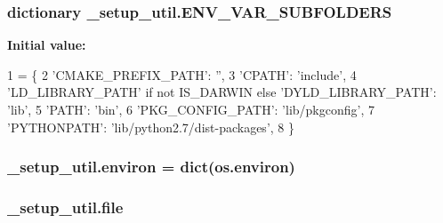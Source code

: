 \subsubsection[{\texorpdfstring{E\+N\+V\+\_\+\+V\+A\+R\+\_\+\+S\+U\+B\+F\+O\+L\+D\+E\+RS}{ENV_VAR_SUBFOLDERS}}]{\setlength{\rightskip}{0pt plus 5cm}dictionary \+\_\+setup\+\_\+util.\+E\+N\+V\+\_\+\+V\+A\+R\+\_\+\+S\+U\+B\+F\+O\+L\+D\+E\+RS}\hypertarget{namespace__setup__util_aa31804f1be8660156ce9394b33c68dc4}{}\label{namespace__setup__util_aa31804f1be8660156ce9394b33c68dc4}
{\bfseries Initial value\+:}
\begin{DoxyCode}
1 = \{
2     \textcolor{stringliteral}{'CMAKE\_PREFIX\_PATH'}: \textcolor{stringliteral}{''},
3     \textcolor{stringliteral}{'CPATH'}: \textcolor{stringliteral}{'include'},
4     \textcolor{stringliteral}{'LD\_LIBRARY\_PATH'} \textcolor{keywordflow}{if} \textcolor{keywordflow}{not} IS\_DARWIN \textcolor{keywordflow}{else} \textcolor{stringliteral}{'DYLD\_LIBRARY\_PATH'}: \textcolor{stringliteral}{'lib'},
5     \textcolor{stringliteral}{'PATH'}: \textcolor{stringliteral}{'bin'},
6     \textcolor{stringliteral}{'PKG\_CONFIG\_PATH'}: \textcolor{stringliteral}{'lib/pkgconfig'},
7     \textcolor{stringliteral}{'PYTHONPATH'}: \textcolor{stringliteral}{'lib/python2.7/dist-packages'},
8 \}
\end{DoxyCode}
\subsubsection[{\texorpdfstring{environ}{environ}}]{\setlength{\rightskip}{0pt plus 5cm}\+\_\+setup\+\_\+util.\+environ = dict(os.\+environ)}\hypertarget{namespace__setup__util_a9a935bdd9ee1aa0327161025bb18c136}{}\label{namespace__setup__util_a9a935bdd9ee1aa0327161025bb18c136}
\subsubsection[{\texorpdfstring{file}{file}}]{\setlength{\rightskip}{0pt plus 5cm}\+\_\+setup\+\_\+util.\+file}\hypertarget{namespace__setup__util_aea63a1b32cc79bc3d872ab7cb30dd07e}{}\label{namespace__setup__util_aea63a1b32cc79bc3d872ab7cb30dd07e}
